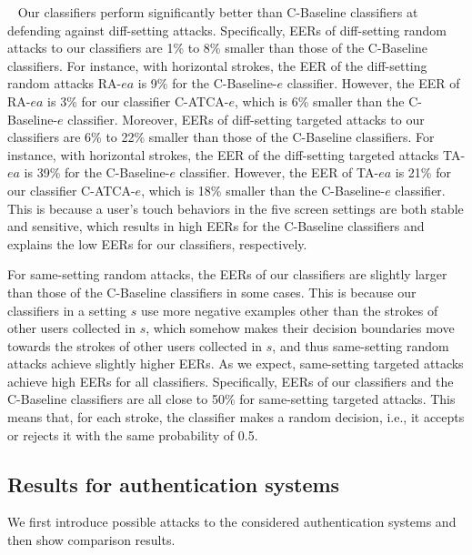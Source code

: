 \documentclass{sig-alternate-05-2015}
\newcommand{\myparatight}[1]{\smallskip\noindent{\bf {#1}:}~}
\begin{document}
\myparatight{C-Baseline vs. C-ATCA} Our classifiers
perform significantly better than C-Baseline classifiers at  defending
against diff-setting attacks. Specifically, EERs of diff-setting random attacks
to our classifiers are 1\% to 8\% smaller than those of the C-Baseline
classifiers. For instance, with horizontal strokes,  the EER of
the diff-setting random attacks RA-$ea$ is 9\% for the C-Baseline-$e$ classifier.
 However, the EER of RA-$ea$ is 3\% for 
our classifier C-ATCA-$e$, which is 6\% smaller than the C-Baseline-$e$ classifier.
 Moreover, EERs of diff-setting
targeted attacks to  our classifiers are 6\% to 22\% smaller than those of the
C-Baseline classifiers. For instance, with horizontal strokes, the
EER of the diff-setting targeted attacks TA-$ea$ is 39\% for the C-Baseline-$e$ classifier.
However, the EER of TA-$ea$ is 21\% for our classifier C-ATCA-$e$, which is 18\% smaller than the 
C-Baseline-$e$ classifier.
This is because a user's
touch behaviors in the five screen settings are both stable and sensitive, which results
in high EERs for the C-Baseline classifiers and explains the low EERs for our
classifiers, respectively.



For same-setting random attacks, the EERs of our classifiers are slightly larger
than those of the C-Baseline classifiers in some cases. This is because our classifiers in a
setting $s$ use more negative examples other than the strokes of other users
collected in $s$, which somehow makes their decision boundaries move towards the
strokes of other users collected in $s$, and thus same-setting random attacks
achieve slightly higher EERs. As we expect, same-setting targeted attacks
achieve high EERs for all classifiers. Specifically, EERs of our classifiers and
the C-Baseline classifiers are all close to 50\% for same-setting targeted
attacks. This means that, for each stroke, the classifier makes a
random decision, i.e., it accepts or rejects it with the same probability of
0.5.





 








\subsection{Results for authentication systems}
We first introduce possible attacks to the considered authentication systems and then show comparison results.
\end{document}
